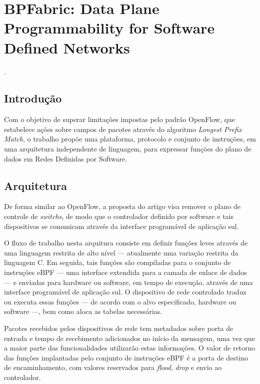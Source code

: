 
\chapter{BPFabric: Data Plane Programmability for Software Defined Networks}
 \cite{jouet2017bpfabric}.

\section*{Introdução}

Com o objetivo de superar limitações impostas pelo padrão OpenFlow, que estabelece ações sobre campos de pacotes através do algoritmo \textit{Longest Prefix Match}, o trabalho propõe uma plataforma, protocolo e conjunto de instruções, em uma arquitetura independente de linguagem, para expressar funções do plano de dados em Redes Definidas por Software.


\section*{Arquitetura}

De forma similar ao OpenFlow, a proposta do artigo visa remover o plano de controle de \textit{switchs}, de modo que o controlador definido por software e tais dispositivos se comunicam através da interface programável de aplicação sul.

O fluxo de trabalho nesta arquitura consiste em definir funções leves através de uma linguagem restrita de alto nível --- atualmente uma variação restrita da linguagem C. Em seguida, tais funções são compiladas para o conjunto de instruções eBPF --- uma interface extendida para a camada de enlace de dados --- e enviadas para hardware ou software, em tempo de execução, através de uma interface programável de aplicação sul. O dispositivo de rede controlado traduz ou executa essas funções --- de acordo com o alvo especificado, hardware ou software ---, bem como aloca as tabelas necessárias.

Pacotes recebidos pelos dispositivos de rede tem metadados sobre porta de entrada e tempo de recebimento adicionados no início da mensagem, uma vez que a maior parte das funcionalidades utilizarão estas informações. O valor de retorno das funções implantadas pelo conjunto de instruções eBPF é a porta de destino de encaminhamento, com valores reservados para \textit{flood}, \textit{drop} e envio ao controlador.

